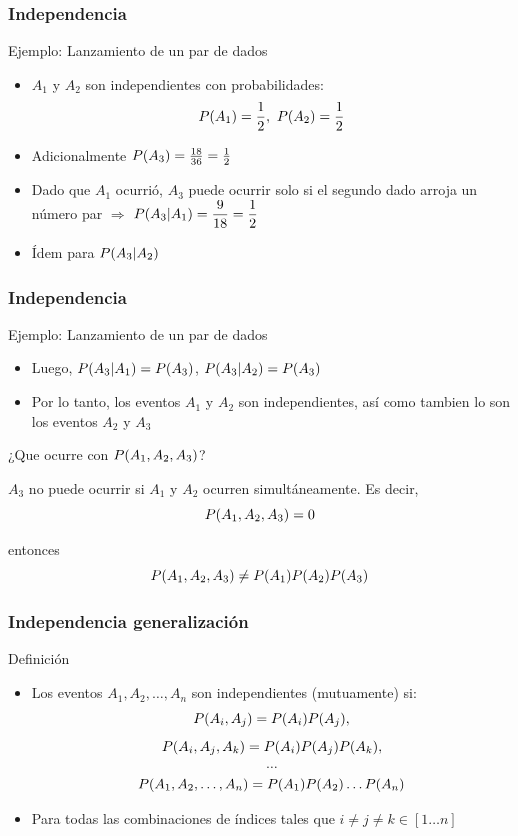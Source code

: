 \documentclass[table]{beamer}
\begin{document}
\begin{frame}
\frametitle{Independencia}
\begin{block}{Ejemplo: Lanzamiento de un par de dados}
    \begin{itemize}
        \item $A_1$ y $A_2$ son independientes con probabilidades: $$\prob{A_1}=\frac{1}{2},\ \prob{A_2}=\frac{1}{2}$$
        \item Adicionalmente $\prob{A_3}=\frac{18}{36}=\frac{1}{2}$
        \item Dado que $A_1$ ocurrió, $A_3$ puede ocurrir solo si el segundo dado arroja un número par $\Rightarrow$ $\prob{A_3|A_1}=\dfrac{9}{18}=\dfrac{1}{2}$
        \item Ídem para $\prob{A_3|A_2}$
    \end{itemize}
\end{block}
\end{frame}

\begin{frame}
\frametitle{Independencia}
\begin{block}{Ejemplo: Lanzamiento de un par de dados}
    \begin{itemize}
        \item Luego, $\prob{A_3|A_1}=\prob{A_3}$, $\prob{A_3|A_2}=\prob{A_3}$
        \item Por lo tanto, los eventos $A_1$ y $A_2$ son independientes, así como tambien lo son los eventos $A_2$ y $A_3$
    \end{itemize}
\end{block}
¿Que ocurre con $\prob{A_1,A_2,A_3}$?
\pause

$A_3$ no puede ocurrir si $A_1$ y $A_2$ ocurren simultáneamente. Es decir, $$\prob{A_1,A_2,A_3}=0$$

entonces $$\prob{A_1,A_2,A_3}\neq \prob{A_1}\prob{A_2}\prob{A_3}$$
\end{frame}


\begin{frame}
    \frametitle{Independencia generalización}
    \begin{block}{Definición}
        \begin{itemize}
            \item Los eventos $A_1,A_2,\ldots ,A_n$ son independientes (mutuamente) si:
                $$\prob{A_i, A_j} = \prob{A_i} \prob{A_j},$$
                $$\prob{A_i, A_j, A_k} = \prob{A_i} \prob{A_j} \prob{A_k},$$
                $$\ldots$$
                $$\prob{A_1,A_2,\ldots ,A_n}=\prob{A_1} \prob{A_2}\ldots \prob{A_n}$$
            \item Para todas las combinaciones de índices tales que $i\neq j\neq k\in [1\ldots n]$
        \end{itemize}
    \end{block}
\end{frame}
\end{document}
